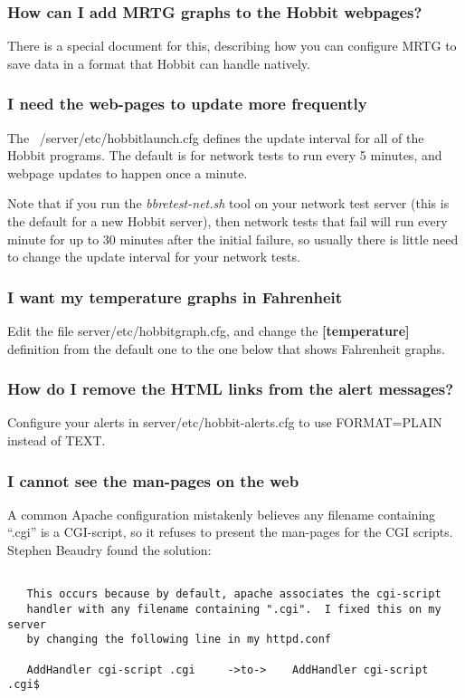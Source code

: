 \subsubsection*{How can I add MRTG graphs to the Hobbit webpages?}


 There is a special document for this, describing how you can configure MRTG to save data in a format that Hobbit can handle natively.
\hline 
\subsubsection*{I need the web-pages to update more frequently}


 The ~/server/etc/hobbitlaunch.cfg defines the update interval for all of the Hobbit programs. The default is for network tests to run every 5 minutes, and webpage updates to happen once a minute.


 Note that if you run the \emph{bbretest-net.sh}
 tool on your network test server (this is the default for a new Hobbit server), then network tests that fail will run every minute for up to 30 minutes after the initial failure, so usually there is little need to change the update interval for your network tests.
\hline 
\subsubsection*{I want my temperature graphs in Fahrenheit}


 Edit the file server/etc/hobbitgraph.cfg, and change the \textbf{[temperature]}
 definition from the default one to the one below that shows Fahrenheit graphs.
\hline 
\subsubsection*{How do I remove the HTML links from the alert messages?}


 Configure your alerts in server/etc/hobbit-alerts.cfg to use FORMAT=PLAIN instead of TEXT.
\hline 
\subsubsection*{I cannot see the man-pages on the web}


 A common Apache configuration mistakenly believes any filename containing ``.cgi'' is a CGI-script, so it refuses to present the man-pages for the CGI scripts. Stephen Beaudry found the solution:
\begin{verbatim}

   This occurs because by default, apache associates the cgi-script
   handler with any filename containing ".cgi".  I fixed this on my server
   by changing the following line in my httpd.conf

   AddHandler cgi-script .cgi     ->to->    AddHandler cgi-script .cgi$

\end{verbatim}
\hline 
